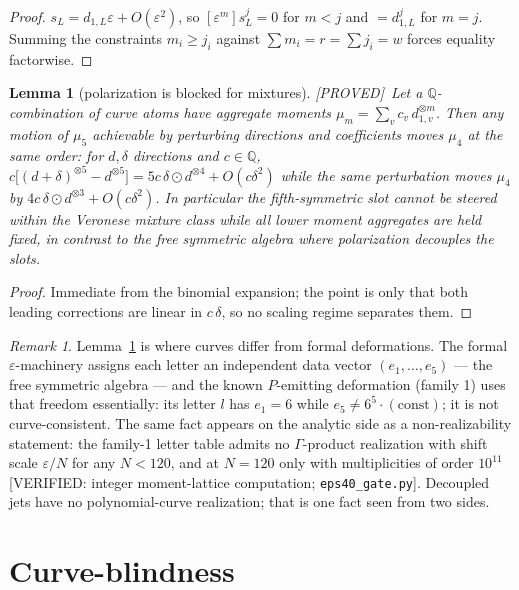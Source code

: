 \documentclass[11pt,reqno]{amsart}
\theoremstyle{plain}
\newtheorem{lemma}[theorem]{Lemma}
\theoremstyle{definition}
\theoremstyle{remark}
\newtheorem{remark}[theorem]{Remark}
\newcommand{\Q}{\mathbb{Q}}
\newcommand{\Proved}{\textup{\textsf{[PROVED]}}}
\newcommand{\VerifiedR}[1]{\textup{\textsf{[VERIFIED: #1]}}}
\begin{document}
\begin{proof}
$s_L=d_{1,L}\varepsilon+O(\varepsilon^2)$, so
$[\varepsilon^m]s_L^j=0$ for $m<j$ and $=d_{1,L}^j$ for $m=j$. Summing the
constraints $m_i\ge j_i$ against $\sum m_i=r=\sum j_i=w$ forces equality
factorwise.
\end{proof}

\begin{lemma}[polarization is blocked for mixtures]\label{lem:polar}
\Proved\
Let a $\Q$-combination of curve atoms have aggregate moments
$\mu_m=\sum_vc_v\,d_{1,v}^{\otimes m}$. Then any motion of $\mu_5$ achievable
by perturbing directions and coefficients moves $\mu_4$ at the same order:
for $d,\delta$ directions and $c\in\Q$,
$c\bigl[(d+\delta)^{\otimes5}-d^{\otimes5}\bigr]
=5c\,\delta\!\odot\!d^{\otimes4}+O(c\delta^2)$ while the same perturbation
moves $\mu_4$ by $4c\,\delta\!\odot\!d^{\otimes3}+O(c\delta^2)$. In
particular the fifth-symmetric slot cannot be steered within the Veronese
mixture class while all lower moment aggregates are held fixed, in contrast
to the free symmetric algebra where polarization decouples the slots.
\end{lemma}

\begin{proof}
Immediate from the binomial expansion; the point is only that both leading
corrections are linear in $c\,\delta$, so no scaling regime separates them.
\end{proof}

\begin{remark}
Lemma~\ref{lem:polar} is where curves differ from formal deformations. The
formal $\varepsilon$-machinery assigns each letter an independent data vector
$(e_1,\dots,e_5)$ --- the free symmetric algebra --- and the known
$P$-emitting deformation (family 1) uses that freedom essentially: its letter
$l$ has $e_1=6$ while $e_5\ne 6^5\cdot(\text{const})$; it is not
curve-consistent. The same fact appears on the analytic side as a
non-realizability statement: the family-1 letter table admits no
$\Gamma$-product realization with shift scale $\varepsilon/N$ for any
$N<120$, and at $N=120$ only with multiplicities of order $10^{11}$
\VerifiedR{integer moment-lattice computation; \texttt{eps40\_gate.py}}.
Decoupled jets have no polynomial-curve realization; that is one fact seen
from two sides.
\end{remark}

\section{Curve-blindness}\label{sec:blind}
\end{document}
